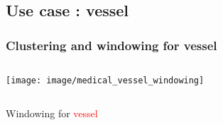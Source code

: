 
	\subsection[Use case : vessel]{Use case : vessel}
		\begin{frame}
			\frametitle{Clustering and windowing for vessel}
		\begin{columns}[c]
			\column{8em}	
				\vspace{1em}
			\column{20em}			
				\texttt{[image: image/medical\_vessel\_windowing]}
		\end{columns}\vspace{2em}
			\begin{center}
				Windowing for \textcolor{red}{vessel}
			\end{center}\vspace{1em}
		\begin{columns}[c]
			\column{10em}			
			\column{10em}
		\end{columns}\vspace{1em}
			
		\end{frame}		



	
